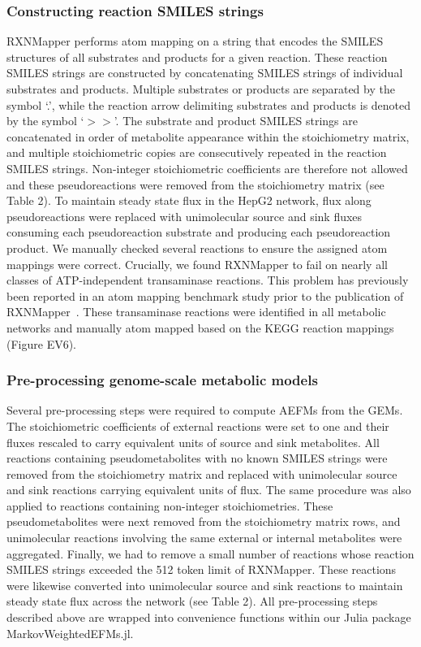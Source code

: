 \documentclass[12pt]{article}
\begin{document}
\subsubsection*{Constructing reaction SMILES strings}

RXNMapper performs atom mapping on a string that encodes the SMILES
structures of all substrates and products for a given reaction. These
reaction SMILES strings are constructed by concatenating SMILES strings of
individual substrates and products. Multiple substrates or products are
separated by the symbol `.', while the reaction arrow delimiting
substrates and products is denoted by the symbol `$>>$'. The substrate and
product SMILES strings are concatenated in order of metabolite appearance
within the stoichiometry matrix, and multiple stoichiometric copies are
consecutively repeated in the reaction SMILES strings. Non-integer
stoichiometric coefficients are therefore not allowed and these
pseudoreactions were removed from the stoichiometry matrix (see Table 2).
To maintain steady state flux in the HepG2 network, flux along
pseudoreactions were replaced with unimolecular source and sink fluxes
consuming each pseudoreaction substrate and producing each pseudoreaction
product. We manually checked several reactions to ensure the assigned atom
mappings were correct. Crucially, we found RXNMapper to fail on nearly all
classes of ATP-independent transaminase reactions. This problem has
previously been reported in an atom mapping benchmark study prior to the
publication of RXNMapper~\citep{PreciatGonzalezGermanA.2017Ceoa}. These
transaminase reactions were identified in all metabolic networks and
manually atom mapped based on the KEGG reaction mappings (Figure EV6).

\subsubsection*{Pre-processing genome-scale metabolic models}

Several pre-processing steps were required to compute AEFMs from the GEMs.
The stoichiometric coefficients of external reactions were set to one and
their fluxes rescaled to carry equivalent units of source and sink
metabolites. All reactions containing pseudometabolites with no known
SMILES strings were removed from the stoichiometry matrix and replaced
with unimolecular source and sink reactions carrying equivalent units of
flux. The same procedure was also applied to reactions containing
non-integer stoichiometries. These pseudometabolites were next removed
from the stoichiometry matrix rows, and unimolecular reactions involving
the same external or internal metabolites were aggregated. Finally, we had
to remove a small number of reactions whose reaction SMILES strings
exceeded the 512 token limit of RXNMapper. These reactions were likewise
converted into unimolecular source and sink reactions to maintain steady
state flux across the network (see Table 2). All pre-processing steps
described above are wrapped into convenience functions within our Julia
package MarkovWeightedEFMs.jl.
\end{document}
